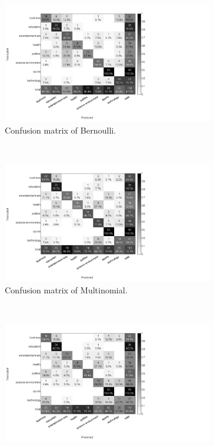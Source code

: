 \renewcommand{\figwidth}{0.43\textwidth}
\begin{figure}[H]
	\centering
	\begin{subfigure}[b]{\figwidth}
		\includegraphics[width=\textwidth,trim=0 0 350 0, clip]{img/Bernou_percentile_5_count.png}
		\caption{Confusion matrix of Bernoulli.}
		\label{fig:confmat-be}
	\end{subfigure}
	~
	\begin{subfigure}[b]{\figwidth}
		\includegraphics[width=\textwidth,trim=0 0 350 0, clip]{img/Multinomial_percentile_5_count.png}
		\caption{Confusion matrix of Multinomial.}
		\label{fig:confmat-mn}
	\end{subfigure}
	\\
	\begin{subfigure}[b]{\figwidth}
		\includegraphics[width=\textwidth,trim=0 0 350 0, clip]{img/RandomForest_percentile_5_count.png}

\end{subfigure}
\end{figure}
